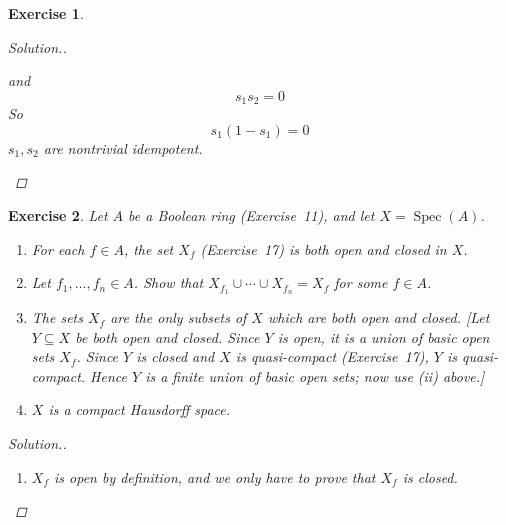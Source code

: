 \documentclass{article}
\theoremstyle{breakstyle}
\newtheorem{exercise}{Exercise}
\newenvironment{solution}
  {\begin{proof}[Solution.]\renewcommand{\qedsymbol}{}}
  {\end{proof}}
\DeclareMathOperator{\spec}{Spec}
\begin{document}
\begin{exercise}
\begin{solution}
\begin{enumerate}[label=({\alph*})]
\begin{enumerate}[label=({\Roman*})]
                        and
                        $$
                        s_1s_2=0
                        $$
                        So
                        $$
                        s_1(1-s_1)=0
                        $$
                        $s_1,s_2$ are nontrivial idempotent.
                \end{enumerate}

        \end{enumerate}
\end{solution}
\end{exercise}

\begin{exercise}
Let \(A\) be a Boolean ring (Exercise~11), and let \(X=\spec(A)\).
\begin{enumerate}[label=(\roman*)]
    \item For each \(f\in A\), the set \(X_f\) (Exercise~17) is both open and closed in \(X\).
    \item Let \(f_1,\ldots,f_n\in A\). Show that \(X_{f_1}\cup\cdots\cup X_{f_n}=X_f\) for some \(f\in A\).
    \item The sets \(X_f\) are the only subsets of \(X\) which are both open and closed. [Let \(Y\subseteq X\) be both open and closed. Since \(Y\) is open, it is a union of basic open sets \(X_f\). Since \(Y\) is closed and \(X\) is quasi-compact (Exercise~17), \(Y\) is quasi-compact. Hence \(Y\) is a finite union of basic open sets; now use (ii) above.]
    \item \(X\) is a compact Hausdorff space.
\end{enumerate}

\begin{solution}
    \begin{enumerate}[label=({\roman*})]
            \item 
                $X_{f}$ is open by definition, and we only have to prove that $X_{f}$ is closed.


\end{enumerate}
\end{solution}
\end{exercise}
\end{document}
